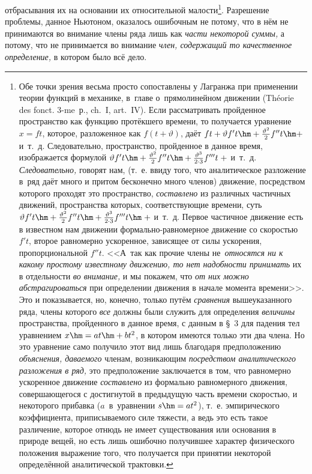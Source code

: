 отбрасывания их на основании их относительной малости\footnote{Обе точки зрения
весьма просто сопоставлены у Лагранжа при применении теории функций в механике,
в~главе о~прямолинейном движении (Théorie des fonct. 3-me~р., ch.~I, art.~IV).
Если рассматривать пройденное пространство как функцию протёкшего времени, то
получается уравнение $x=ft$, которое, разложенное как $f(t+\vartheta)$, даёт
$ft+\vartheta f't\hm+\frac{\vartheta^2}2f''t\hm+$ и~т.~д. Следовательно,
пространство, пройденное в данное время, изображается формулой
$\vartheta f't\hm+\frac{\vartheta^2}2f''t\hm+
\frac{\vartheta^3}{2\cdot 3}f'''t\;+$ и~т.~д. {\em Следовательно,} говорят нам,
(т.~е. ввиду того, что аналитическое разложение в~ряд даёт много и притом
бесконечно много членов) движение, посредством которого проходят это
пространство, {\em составлено} из различных частичных движений, пространства
которых, соответствующие времени, суть
$\vartheta f't\hm+\frac{\vartheta^2}2f''t\hm+
\frac{\vartheta^3}{2\cdot 3}f'''t\hm\;+$ и~т.~д. Первое частичное движение
есть в известном нам движении формально-равномерное движение со скоростью
$f't$, второе равномерно ускоренное, зависящее от силы ускорения,
пропорциональной $f''t$. <<А~так как прочие члены не~{\em относятся ни к какому
простому известному движению, то нет надобности принимать} их в отдельности
{\em во внимание,} и мы покажем, что {\em от них можно абстрагироваться} при
определении движения в начале момента времени>>. Это и показывается, но,
конечно, только путём {\em сравнения} вышеуказанного ряда, члены которого
{\em все} должны были служить для определения {\em величины} пространства,
пройденного в данное время, с данным в \S~3 для падения тел уравнением
$x\hm=at\hm+bt^2$, в котором имеются только эти два члена. Но это уравнение
само получило этот вид лишь благодаря предположению {\em объяснения, даваемого}
членам, возникающим {\em посредством аналитического разложения в ряд,} это
предположение заключается в том, что равномерно ускоренное движение
{\em составлено} из формально равномерного движения, совершающегося
с достигнутой в предыдущую часть времени скоростью, и некоторого прибавка
($a$~в~уравнении $s\hm=at^2$), т.~е. эмпирического коэффициента, приписываемого
силе тяжести, а ведь это есть такое различение, которое отнюдь не имеет
существования или основания в природе вещей, но есть лишь ошибочно получившее
характер физического положения выражение того, что получается при принятии
некоторой определённой аналитической трактовки.}. Разрешение проблемы, данное
Ньютоном, оказалось ошибочным не потому, что в нём не принимаются во внимание
члены ряда лишь как {\em части некоторой суммы,} а потому, что не принимается
во внимание {\em член, содержащий то качественное определение,} в котором было
всё дело.

